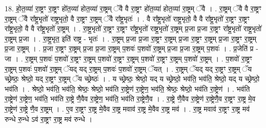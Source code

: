 \documentclass[17pt]{extarticle}
\begin{document}
18. हो॒त॒व्या॑ रा॒ष्ट्रꣳ रा॒ष्ट्रꣳ हो॑त॒व्या॑ होत॒व्या॑ रा॒ष्ट्रम् ॅवै वै रा॒ष्ट्रꣳ हो॑त॒व्या॑ होत॒व्या॑ रा॒ष्ट्रम् ॅवै । . रा॒ष्ट्रम् ॅवै वै रा॒ष्ट्रꣳ रा॒ष्ट्रम् ॅवै रा᳚ष्ट्र॒भृतो॑ राष्ट्र॒भृतो॒ वै रा॒ष्ट्रꣳ रा॒ष्ट्रम् ॅवै रा᳚ष्ट्र॒भृतः॑ । . वै रा᳚ष्ट्र॒भृतो॑ राष्ट्र॒भृतो॒ वै वै रा᳚ष्ट्र॒भृतो॑ रा॒ष्ट्रꣳ रा॒ष्ट्रꣳ रा᳚ष्ट्र॒भृतो॒ वै वै 
रा᳚ष्ट्र॒भृतो॑ रा॒ष्ट्रम् । . रा॒ष्ट्र॒भृतो॑ रा॒ष्ट्रꣳ रा॒ष्ट्रꣳ रा᳚ष्ट्र॒भृतो॑ राष्ट्र॒भृतो॑ रा॒ष्ट्रम् प्र॒जा प्र॒जा रा॒ष्ट्रꣳ 
रा᳚ष्ट्र॒भृतो॑ राष्ट्र॒भृतो॑ रा॒ष्ट्रम् प्र॒जा । . रा॒ष्ट्र॒भृत॒ इति॑ राष्ट्र - भृतः॑ । . रा॒ष्ट्रम् प्र॒जा प्र॒जा रा॒ष्ट्रꣳ रा॒ष्ट्रम् प्र॒जा रा॒ष्ट्रꣳ रा॒ष्ट्रम् प्र॒जा रा॒ष्ट्रꣳ रा॒ष्ट्रम् प्र॒जा रा॒ष्ट्रम् । . प्र॒जा रा॒ष्ट्रꣳ रा॒ष्ट्रम् प्र॒जा प्र॒जा रा॒ष्ट्रम् प॒शवः॑ प॒शवो॑ रा॒ष्ट्रम् प्र॒जा प्र॒जा रा॒ष्ट्रम् प॒शवः॑ । . प्र॒जेति॑ प्र - जा । . रा॒ष्ट्रम् प॒शवः॑ प॒शवो॑ रा॒ष्ट्रꣳ रा॒ष्ट्रम् प॒शवो॑ रा॒ष्ट्रꣳ रा॒ष्ट्रम् प॒शवो॑ रा॒ष्ट्रꣳ रा॒ष्ट्रम् प॒शवो॑ रा॒ष्ट्रम् । . प॒शवो॑ रा॒ष्ट्रꣳ रा॒ष्ट्रम् प॒शवः॑ प॒शवो॑ रा॒ष्ट्रम् ॅयद् यद् रा॒ष्ट्रम् प॒शवः॑ प॒शवो॑ रा॒ष्ट्रम् ॅयत् । . रा॒ष्ट्रम् ॅयद् यद् रा॒ष्ट्रꣳ रा॒ष्ट्रम् ॅय च्छ्रेष्ठः॒ श्रेष्ठो॒ यद् रा॒ष्ट्रꣳ रा॒ष्ट्रम् ॅय च्छ्रेष्ठः॑ । . य च्छ्रेष्ठः॒ श्रेष्ठो॒ यद् य च्छ्रेष्ठो॒ भव॑ति॒ भव॑ति॒ श्रेष्ठो॒ यद् य च्छ्रेष्ठो॒ भव॑ति । . श्रेष्ठो॒ भव॑ति॒ भव॑ति॒ श्रेष्ठः॒ श्रेष्ठो॒ भव॑ति रा॒ष्ट्रेण॑ रा॒ष्ट्रेण॒ भव॑ति॒ श्रेष्ठः॒ श्रेष्ठो॒ भव॑ति रा॒ष्ट्रेण॑ । . भव॑ति रा॒ष्ट्रेण॑ रा॒ष्ट्रेण॒ भव॑ति॒ भव॑ति रा॒ष्ट्रे णै॒वैव रा॒ष्ट्रेण॒ भव॑ति॒ भव॑ति रा॒ष्ट्रेणै॒व । . रा॒ष्ट्रे णै॒वैव रा॒ष्ट्रेण॑ रा॒ष्ट्रेणै॒व रा॒ष्ट्रꣳ रा॒ष्ट्र मे॒व रा॒ष्ट्रेण॑ रा॒ष्ट्रे णै॒व रा॒ष्ट्रम् । . ए॒व रा॒ष्ट्रꣳ रा॒ष्ट्र मे॒वैव रा॒ष्ट्र मवाव॑ रा॒ष्ट्र मे॒वैव रा॒ष्ट्र मव॑ । . रा॒ष्ट्र मवाव॑ रा॒ष्ट्रꣳ रा॒ष्ट्र मव॑ रुन्धे रु॒न्धे ऽव॑ रा॒ष्ट्रꣳ रा॒ष्ट्र मव॑ रुन्धे । \newline
\end{document}

